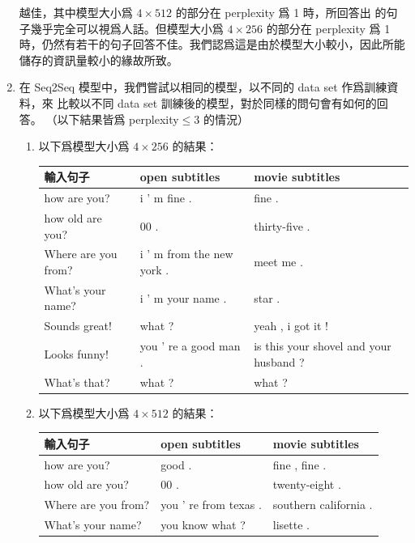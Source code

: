 \documentclass[12pt, a4paper]{article}
\theoremstyle{mystyle}	%
\begin{document}
\begin{enumerate}
  越佳，其中模型大小爲 $4 \times 512$ 的部分在 perplexity 爲 1 時，所回答出
  的句子幾乎完全可以視爲人話。但模型大小爲 $4 \times 256$ 的部分在 perplexity
  爲 1 時，仍然有若干的句子回答不佳。我們認爲這是由於模型大小較小，因此所能
  儲存的資訊量較小的緣故所致。
\item 在 Seq2Seq 模型中，我們嘗試以相同的模型，以不同的 data set 作爲訓練資料，來
  比較以不同 data set 訓練後的模型，對於同樣的問句會有如何的回答。
  （以下結果皆爲 perplexity$\le 3$ 的情況）
  \begin{enumerate}
  \item 以下爲模型大小爲 $4 \times 256$ 的結果：\\
    \begin{tabular}{lll}
      \hline
      輸入句子            & open subtitles            & movie subtitles \\
      \hline
      \hline
      how are you?        & i ' m fine .              & fine . \\
      \hline
      how old are you?    & 00 .                      & thirty-five . \\
      \hline
      Where are you from? & i ' m from the new york . & meet me . \\
      \hline
      What's your name?   & i ' m your name .         & star . \\
      \hline
      Sounds great!       & what ?                    & yeah , i got it ! \\
      \hline
      Looks funny!        & you ' re a good man .     & is this your shovel and your husband ? \\
      \hline
      What's that?        & what ?                    & what ? \\
      \hline
    \end{tabular}
  \item 以下爲模型大小爲 $4 \times 512$ 的結果：\\
    \begin{tabular}{lll}
      \hline
      輸入句子            & open subtitles            & movie subtitles \\
      \hline
      \hline
      how are you?        & good .                    & fine , fine . \\
      \hline
      how old are you?    & 00 .                      & twenty-eight . \\
      \hline
      Where are you from? & you ' re from texas .     & southern california . \\
      \hline
      What's your name?   & you know what ?           & lisette . \\

\end{tabular}
\end{enumerate}
\end{enumerate}
\end{document}
